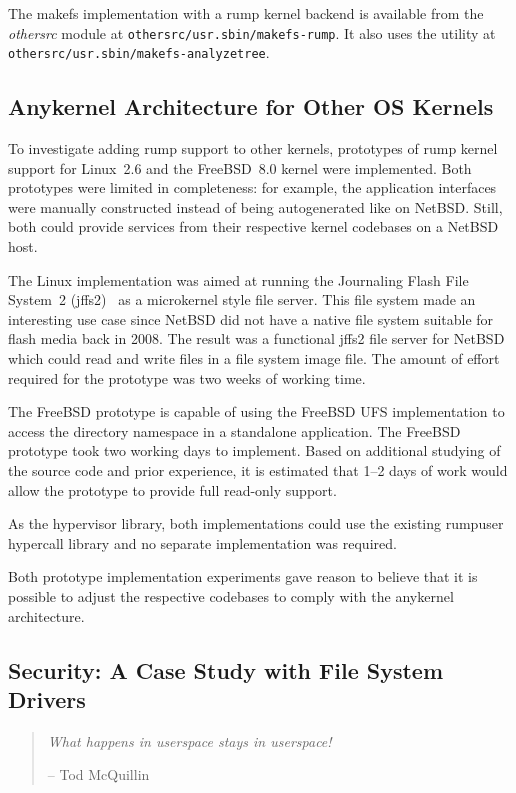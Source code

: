The makefs implementation with a rump kernel backend is available
from the \textit{othersrc} module
at \texttt{othersrc/usr.sbin/makefs-rump}.  It also uses the utility at
\texttt{othersrc/usr.sbin/makefs-analyzetree}.


\subsection{Anykernel Architecture for Other OS Kernels}
\label{sect:otherkern}

To investigate adding rump support to other kernels, prototypes
of rump kernel support for Linux~2.6 and the FreeBSD~8.0 kernel
were implemented.  Both prototypes were limited in
completeness: for example, the application interfaces were manually constructed
instead
of being autogenerated like on NetBSD.  Still, both could provide
services from their respective kernel codebases on a NetBSD host.

The Linux implementation was aimed at running the Journaling Flash
File System~2 (jffs2)~\cite{woodhouse:jffs2} as a microkernel
style file server.  This file system made an interesting use case since
NetBSD did not have a native file system suitable for flash media back
in 2008.  The result was a functional jffs2 file server for NetBSD which
could read and write files in a file system image file.  The amount of
effort required for the prototype was two weeks of working time.

The FreeBSD prototype is capable of using the FreeBSD UFS
implementation to access the directory namespace in a standalone
application.  The FreeBSD prototype took two working days to
implement.  Based on additional studying of the source code and prior
experience, it is estimated that 1--2 days of work would allow the
prototype to provide full read-only support.

As the hypervisor library, both implementations could use the
existing rumpuser hypercall library and no separate implementation
was required.

Both prototype implementation experiments gave reason to believe
that it is possible to adjust the respective codebases to comply
with the anykernel architecture.

\subsection{Security: A Case Study with File System Drivers}
\label{sect:securitycase}

\begin{quote}
\emph{What happens in userspace stays in userspace!}

-- Tod McQuillin
\end{quote}

